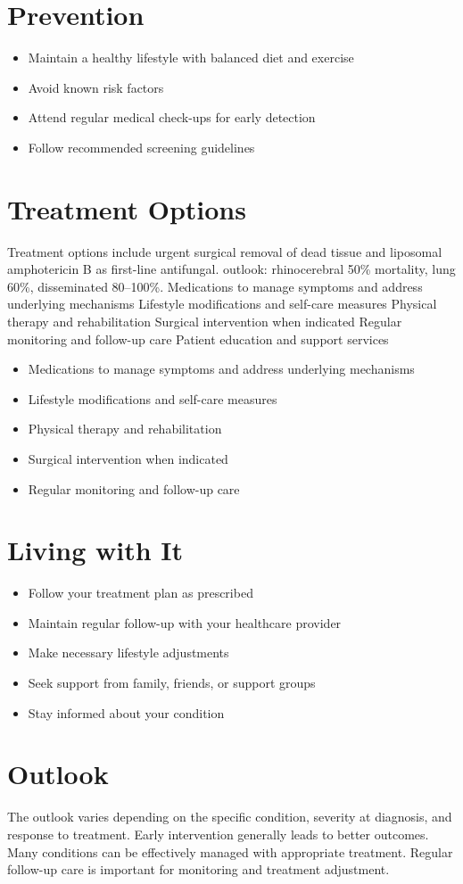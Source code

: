 \section{Prevention}
\begin{itemize}[noitemsep]
  \item Maintain a healthy lifestyle with balanced diet and exercise
  \item Avoid known risk factors
  \item Attend regular medical check-ups for early detection
  \item Follow recommended screening guidelines
\end{itemize}
\section{Treatment Options}
Treatment options include urgent surgical removal of dead tissue and liposomal amphotericin B as first-line antifungal. outlook: rhinocerebral 50\% mortality, lung 60\%, disseminated 80--100\%. Medications to manage symptoms and address underlying mechanisms Lifestyle modifications and self-care measures Physical therapy and rehabilitation Surgical intervention when indicated Regular monitoring and follow-up care Patient education and support services

\begin{itemize}[noitemsep]
  \item Medications to manage symptoms and address underlying mechanisms
  \item Lifestyle modifications and self-care measures
  \item Physical therapy and rehabilitation
  \item Surgical intervention when indicated
  \item Regular monitoring and follow-up care
\end{itemize}
\section{Living with It}
\begin{itemize}[noitemsep]
  \item Follow your treatment plan as prescribed
  \item Maintain regular follow-up with your healthcare provider
  \item Make necessary lifestyle adjustments
  \item Seek support from family, friends, or support groups
  \item Stay informed about your condition
\end{itemize}
\section{Outlook}
The outlook varies depending on the specific condition, severity at diagnosis, and response to treatment. Early intervention generally leads to better outcomes. Many conditions can be effectively managed with appropriate treatment. Regular follow-up care is important for monitoring and treatment adjustment.
